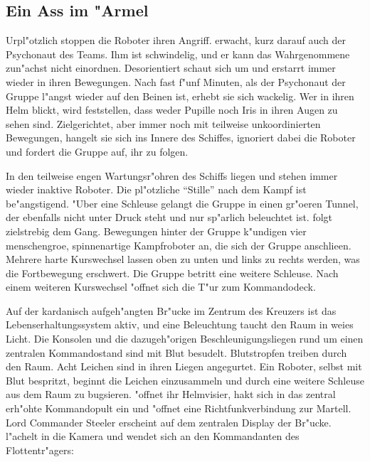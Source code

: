 \subsection{Ein Ass im "Armel}
Urpl"otzlich stoppen die Roboter ihren Angriff. \xl{} erwacht, kurz darauf auch der Psychonaut des Teams. Ihm ist schwindelig, und er kann das Wahrgenommene zun"achst nicht einordnen. Desorientiert schaut sich \xl{} um und erstarrt immer wieder in ihren Bewegungen. Nach fast f"unf Minuten, als der Psychonaut der Gruppe l"angst wieder auf den Beinen ist, erhebt sie sich wackelig. Wer in ihren Helm blickt, wird feststellen, dass weder Pupille noch Iris in ihren Augen zu sehen sind. Zielgerichtet, aber immer noch mit teilweise unkoordinierten Bewegungen, hangelt sie sich ins Innere des Schiffes, ignoriert dabei die Roboter und fordert die Gruppe auf, ihr zu folgen.


In den teilweise engen Wartungsr"ohren des Schiffs liegen und stehen immer wieder inaktive Roboter. Die pl"otzliche "`Stille"' nach dem Kampf ist be"angstigend. "Uber eine Schleuse gelangt die Gruppe in einen gr"o\3eren Tunnel, der ebenfalls nicht unter Druck steht und nur sp"arlich beleuchtet ist. \xl{} folgt zielstrebig dem Gang. Bewegungen hinter der Gruppe k"undigen vier menschengro\3e, spinnenartige Kampfroboter an, die sich der Gruppe anschlie\3en. Mehrere harte Kurswechsel lassen oben zu unten und links zu rechts werden, was die Fortbewegung erschwert. Die Gruppe betritt eine weitere Schleuse. Nach einem weiteren Kurswechsel "offnet sich die T"ur zum Kommandodeck.

Auf der kardanisch aufgeh"angten Br"ucke im Zentrum des Kreuzers ist das Lebenserhaltungssystem aktiv, und eine Beleuchtung taucht den Raum in wei\3es Licht. Die Konsolen und die dazugeh"origen Beschleunigungsliegen rund um einen zentralen Kommandostand sind mit Blut besudelt. Blutstropfen treiben durch den Raum. Acht Leichen sind in ihren Liegen angegurtet. Ein Roboter, selbst mit Blut bespritzt, beginnt die Leichen einzusammeln und durch eine weitere Schleuse aus dem Raum zu bugsieren. \xl{} "offnet ihr Helmvisier, hakt sich in das zentral erh"ohte Kommandopult ein und "offnet eine Richtfunkverbindung zur Martell. Lord Commander Steeler erscheint auf dem zentralen Display der Br"ucke. \xl{} l"achelt in die Kamera und wendet sich an den Kommandanten des Flottentr"agers:

